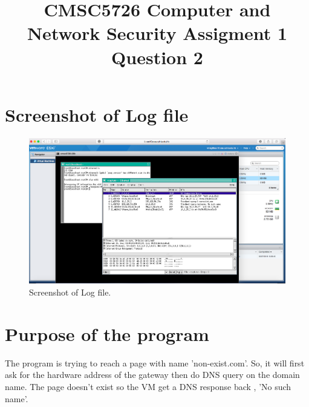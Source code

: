 \documentclass[12pt]{article}
\title{CMSC5726 Computer and Network Security Assigment 1 Question 2}
\date{}
\begin{document}
  \maketitle

\section{Screenshot of Log file}

\begin{figure}[h]
  \includegraphics[width=\linewidth]{log.png}
  \caption{Screenshot of Log file.}
  \label{fig:vr1}
\end{figure}

\section{Purpose of the program}
The program is trying to reach a page with name 'non-exist.com'. So, it will first ask for the hardware address of the gateway then do DNS query on the domain name. The page doesn't exist so the VM get a DNS response back , 'No such name'.
\end{document}
